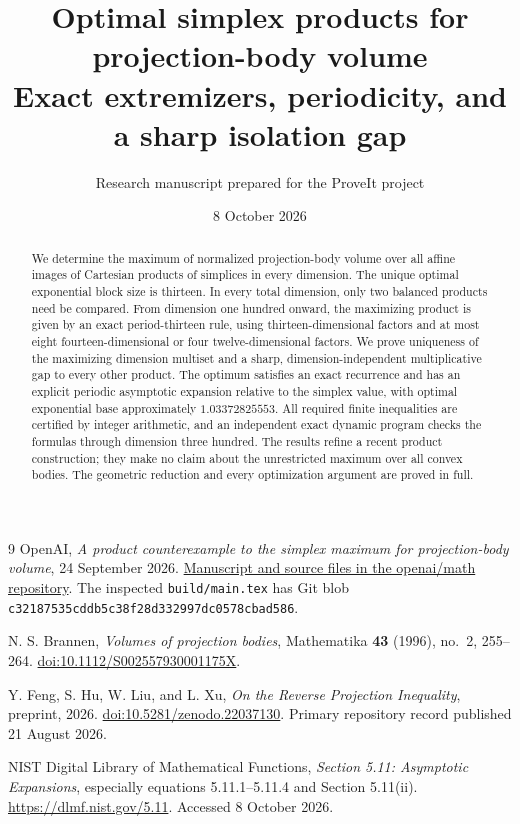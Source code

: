 \documentclass[11pt]{article}
\title{Optimal simplex products for projection-body volume\\[0.4em]
  \large Exact extremizers, periodicity, and a sharp isolation gap}
\author{Research manuscript prepared for the ProveIt project}
\date{8 October 2026}
\begin{document}
\maketitle
\begin{abstract}
We determine the maximum of normalized projection-body volume over
all affine images of Cartesian products of simplices in every
dimension. The unique optimal exponential block size is thirteen.
In every total dimension, only two balanced products need be compared.
From dimension one hundred onward, the maximizing product is given
by an exact period-thirteen rule, using thirteen-dimensional factors
and at most eight fourteen-dimensional or four twelve-dimensional
factors. We prove uniqueness of the maximizing dimension multiset and
a sharp, dimension-independent multiplicative gap to every other
product. The optimum satisfies an exact recurrence and has an explicit
periodic asymptotic expansion relative to the simplex value, with
optimal exponential base approximately $1.03372825553$.
All required finite inequalities are certified by integer arithmetic,
and an independent exact dynamic program checks the formulas through
dimension three hundred. The results refine a recent product
construction; they make no claim about the unrestricted maximum over
all convex bodies. The geometric reduction and every optimization
argument are proved in full.
\end{abstract}
\begingroup\small\tableofcontents\endgroup
\clearpage

\begin{thebibliography}{9}
OpenAI,
\emph{A product counterexample to the simplex maximum for
projection-body volume}, 24 September 2026.
\href{https://github.com/openai/math/tree/adc7f1241b42e322a6451854ab7e4b4c146bf78a/preprints/A-product-counterexample-to-the-simplex-maximum-for-projection-body-volume-September-24-2026}{Manuscript and source files in the openai/math repository}.
The inspected \texttt{build/main.tex} has Git blob
\texttt{c32187535cddb5c38f28d332997dc0578cbad586}.

N. S. Brannen,
\emph{Volumes of projection bodies},
Mathematika \textbf{43} (1996), no.~2, 255--264.
\href{https://doi.org/10.1112/S002557930001175X}{doi:10.1112/S002557930001175X}.

Y. Feng, S. Hu, W. Liu, and L. Xu,
\emph{On the Reverse Projection Inequality}, preprint, 2026.
\href{https://doi.org/10.5281/zenodo.22037130}{doi:10.5281/zenodo.22037130}.
Primary repository record published 21 August 2026.

NIST Digital Library of Mathematical Functions,
\emph{Section 5.11: Asymptotic Expansions}, especially
equations 5.11.1--5.11.4 and Section 5.11(ii).
\url{https://dlmf.nist.gov/5.11}.
Accessed 8 October 2026.
\end{thebibliography}
\end{document}
